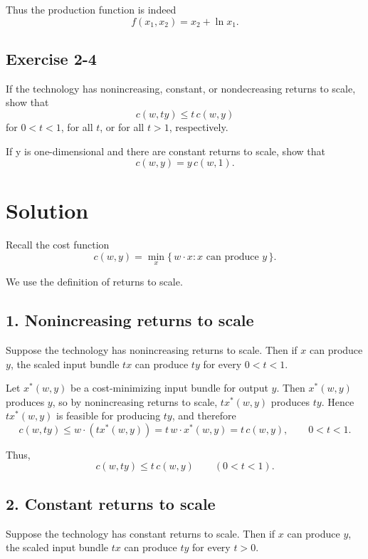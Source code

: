 Thus the production function is indeed
\[
\boxed{
f(x_1,x_2)=x_2+\ln x_1.
}
\]


\vspace{30pt}
\begin{tcolorbox}[breakable]

\subsection*{Exercise 2-4}

If the technology has nonincreasing, constant, or nondecreasing returns to scale,
show that
\[
c(w,ty) \le t\,c(w,y)
\]
for $0<t<1$, for all $t$, or for all $t>1$, respectively.

If y is one-dimensional and there are constant returns to scale, show that
\[
c(w,y)=y\,c(w,1).
\]

\end{tcolorbox}


\section*{Solution}

Recall the cost function
\[
c(w,y)=\min_{x}\{\,w\cdot x : x \text{ can produce } y\,\}.
\]

We use the definition of returns to scale.

\subsection*{1. Nonincreasing returns to scale}

Suppose the technology has nonincreasing returns to scale.  
Then if \(x\) can produce \(y\), the scaled input bundle \(tx\) can produce \(ty\) for every \(0<t<1\).

Let \(x^*(w,y)\) be a cost-minimizing input bundle for output \(y\). Then \(x^*(w,y)\) produces \(y\), so by nonincreasing returns to scale, \(t x^*(w,y)\) produces \(ty\). Hence \(t x^*(w,y)\) is feasible for producing \(ty\), and therefore
\[
c(w,ty)\le w\cdot (t x^*(w,y))=t\, w\cdot x^*(w,y)=t\,c(w,y),
\qquad 0<t<1.
\]

Thus,
\[
\boxed{c(w,ty)\le t\,c(w,y)\qquad (0<t<1).}
\]

\subsection*{2. Constant returns to scale}

Suppose the technology has constant returns to scale.  
Then if \(x\) can produce \(y\), the scaled input bundle \(tx\) can produce \(ty\) for every \(t>0\).

